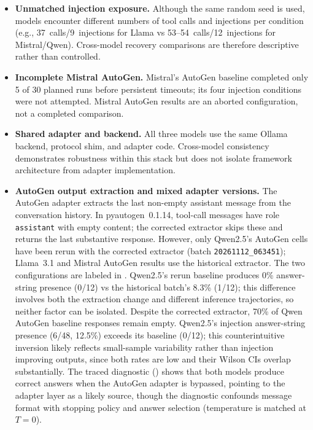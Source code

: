\documentclass[make,article,submit,moreauthors,pdftex]{mdpi}
\begin{document}
\begin{itemize}
  \item {\color{magenta}\textbf{Unmatched injection exposure.} Although the same random seed is used, models encounter different numbers of tool calls and injections per condition (e.g., 37~calls/9~injections for Llama vs 53--54~calls/12~injections for Mistral/Qwen). Cross-model recovery comparisons are therefore descriptive rather than controlled.}
  \item {\color{magenta}\textbf{Incomplete Mistral AutoGen.} Mistral's AutoGen baseline completed only 5 of 30 planned runs before persistent timeouts; its four injection conditions were not attempted. Mistral AutoGen results are an aborted configuration, not a completed comparison.}
  \item {\color{magenta}\textbf{Shared adapter and backend.} All three models use the same Ollama backend, protocol shim, and adapter code. Cross-model consistency demonstrates robustness within this stack but does not isolate framework architecture from adapter implementation.}
  \item {\color{magenta}\textbf{AutoGen output extraction and mixed adapter versions.} The AutoGen adapter extracts the last non-empty assistant message from the conversation history. In pyautogen~0.1.14, tool-call messages have role \texttt{assistant} with empty content; the corrected extractor skips these and returns the last substantive response. However, only Qwen2.5's AutoGen cells have been rerun with the corrected extractor (batch \texttt{20261112\_063451}); Llama~3.1 and Mistral AutoGen results use the historical extractor. The two configurations are labeled in . Qwen2.5's rerun baseline produces 0\% answer-string presence (0/12) vs the historical batch's 8.3\% (1/12); this difference involves both the extraction change and different inference trajectories, so neither factor can be isolated. Despite the corrected extractor, 70\% of Qwen AutoGen baseline responses remain empty. Qwen2.5's injection answer-string presence (6/48, 12.5\%) exceeds its baseline (0/12); this counterintuitive inversion likely reflects small-sample variability rather than injection improving outputs, since both rates are low and their Wilson CIs overlap substantially. The traced diagnostic () shows that both models produce correct answers when the AutoGen adapter is bypassed, pointing to the adapter layer as a likely source, though the diagnostic confounds message format with stopping policy and answer selection (temperature is matched at $T\!=\!0$).}
\end{itemize}
\end{document}
